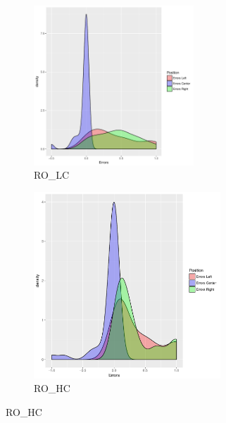 \begin{figure}[h]
	\begin{subfigure}{0.5\textwidth}
	\includegraphics[width=1\linewidth, height=6cm]{../../results/figures/errorDistributionRO_LC} 
	\caption{RO\_LC}
	\label{fig:errdistsubim3}
	\end{subfigure}
	\begin{subfigure}{0.5\textwidth}
	\includegraphics[width=1\linewidth, height=7cm]{../../results/figures/errorDistributionRO_HC}
	\caption{RO\_HC}
	\label{fig:errdistsubim4}
	\end{subfigure}


\end{figure}
